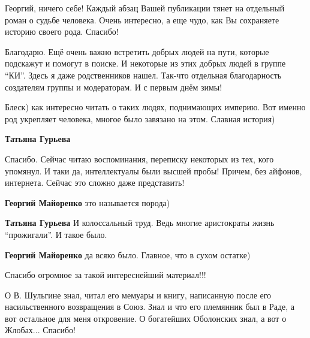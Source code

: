  
 
 
 
 
\zzSecCmt

\begin{itemize} %

Георгий, ничего себе! Каждый абзац Вашей публикации тянет на отдельный роман о
судьбе человека. Очень интересно, а еще чудо, как Вы сохраняете историю своего
рода. Спасибо!



Благодарю. Ещё очень важно встретить добрых людей на пути, которые подскажут и
помогут в поиске. И некоторые из этих добрых людей в группе \enquote{КИ}. Здесь я даже
родственников нашел. Так-что отдельная благодарность создателям группы и
модераторам. И с первым днём зимы!


Блеск) как интересно читать о таких людях, поднимающих империю. Вот именно род
укрепляет человека, многое было завязано на этом. Славная история)

\begin{itemize} %
\textbf{Татьяна Гурьева} 

Спасибо. Сейчас читаю воспоминания, переписку некоторых из тех, кого упомянул.
И таки да, интеллектуалы были высшей пробы! Причем, без айфонов, интернета.
Сейчас это сложно даже представить!

\textbf{Георгий Майоренко} это называется порода)

\begin{itemize} %
\textbf{Татьяна Гурьева} И колоссальный труд. Ведь многие аристократы жизнь \enquote{прожигали}. И такое было.
\end{itemize} %

\textbf{Георгий Майоренко} да всяко было. Главное, что в сухом остатке)


Спасибо огромное за такой интереснейший материал!!!

О В. Шульгине знал, читал его мемуары и книгу, написанную после его
насильственного возвращения в Союз. Знал и что его племянник был в Раде, а вот
остальное для меня откровение. О богатейших Оболонских знал, а вот о
Жлобах... Спасибо!


\end{itemize}
\end{itemize}
